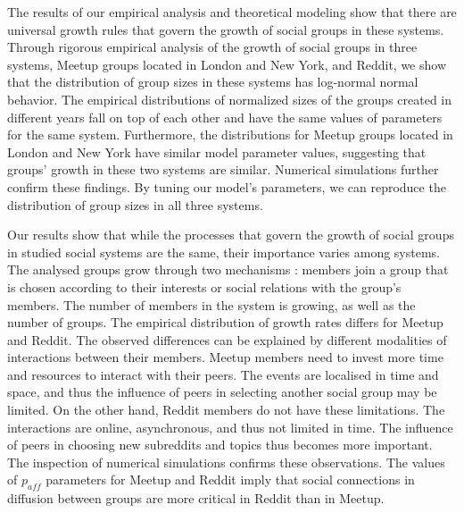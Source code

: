 The results of our empirical analysis and theoretical modeling show that there are universal growth rules that govern the growth of social groups in these systems. Through rigorous empirical analysis of the growth of social groups in three systems, Meetup groups located in London and New York, and Reddit, we show that the distribution of group sizes in these systems has log-normal normal behavior. The empirical distributions of normalized sizes of the groups created in different years fall on top of each other and have the same values of parameters for the same system. Furthermore, the distributions for Meetup groups located in London and New York have similar model parameter values, suggesting that groups' growth in these two systems are similar. Numerical simulations further confirm these findings. By tuning our model's parameters, we can reproduce the distribution of group sizes in all three systems.  

Our results show that while the processes that govern the growth of social groups in studied social systems are the same, their importance varies among systems. The analysed groups grow through two mechanisms \cite{zheleva2009co}: members join a group that is chosen according to their interests or social relations with the group's members.
The number of members in the system is growing, as well as the number of groups. The empirical distribution of growth rates differs for Meetup and Reddit. The observed differences can be explained by different modalities of interactions between their members. Meetup members need to invest more time and resources to interact with their peers. The events are localised in time and space, and thus the influence of peers in selecting another social group may be limited. On the other hand, Reddit members do not have these limitations. The interactions are online, asynchronous, and thus not limited in time. The influence of peers in choosing new subreddits and topics thus becomes more important. The inspection of numerical simulations confirms these observations. The values of $p_{aff}$ parameters for Meetup and Reddit imply that social connections in diffusion between groups are more critical in Reddit than in Meetup.   

